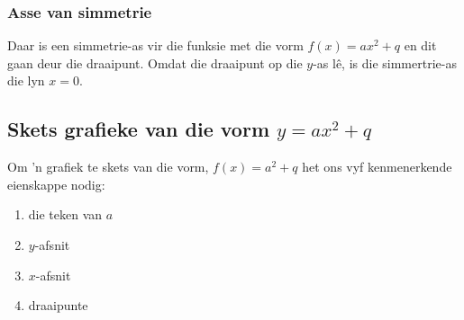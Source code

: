 \subsubsection*{Asse van simmetrie}

Daar is een simmetrie-as vir die funksie met die vorm $f(x)=ax^{2}+q$ en dit gaan deur die draaipunt. Omdat die draaipunt op die $y$-as lê, is die simmertrie-as die lyn $x=0$. 

\subsection*{Skets grafieke van die vorm $y=ax^{2}+q$}

Om ’n grafiek te skets van die vorm, $f(x)=a^{2}+q$ het ons vyf kenmenerkende eienskappe nodig:
\begin{enumerate}[noitemsep, label=\textbf{\arabic*}. ] 
\item die teken van $a$
\item $y$-afsnit
\item $x$-afsnit
\item draaipunte

\end{enumerate}


